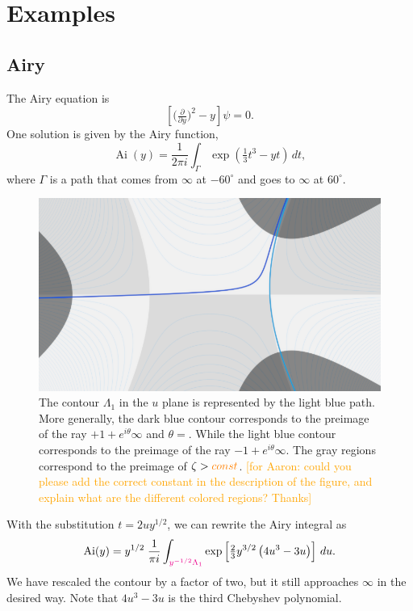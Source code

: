 \documentclass{article}
\let\Re\relax
\DeclareMathOperator{\Re}{Re}
\DeclareMathOperator{\Ai}{Ai}
\theoremstyle{definition}
\theoremstyle{plain}
\begin{document}
\section{Examples}\label{sec:examples}

\subsection{Airy}

The Airy equation is
\begin{equation}\label{eqn:airy}
\left[\big(\tfrac{\partial}{\partial y}\big)^2 - y\right] \psi = 0.
\end{equation}
One solution is given by the Airy function,
\[ \Ai(y) = \frac{1}{2\pi i} \int_{\Gamma} \exp\left(\tfrac{1}{3}t^3 - yt\right)\,dt, \]
where $\Gamma$ is a path that comes from $\infty$ at $-60^\circ$ and goes to $\infty$ at $60^\circ$.

\begin{figure}[ht]
    \centering
    \includegraphics[scale=0.3]{figures/thimble_Airy.png}
    \caption{\small The contour $\Lambda_1$ in the $u$ plane is represented by the light blue path. More generally, the dark blue contour corresponds to the preimage of the ray $+1+e^{i\theta}\infty$ and $\theta=$. While the light blue contour corresponds to the preimage of the ray $-1+e^{i\theta}\infty$. The gray regions correspond to the preimage of $\Re \zeta> \textcolor{orange}{const}$. \textcolor{orange}{[for Aaron: could you please add the correct constant in the description of the figure, and explain what are the different colored regions? Thanks]}}
    \label{fig:path_Airy}
\end{figure}


With the substitution $t = 2uy^{1/2}$, we can rewrite the Airy integral as
\[ \Ai(y) = y^{1/2}\;\frac{1}{\pi i} \int_{\textcolor{magenta}{y^{-1/2} \Lambda_1}} \exp\left[\tfrac{2}{3}y^{3/2} \left(4u^3 - 3u\right)\right]\,du. \]
We have rescaled the contour by a factor of two, but it still approaches $\infty$ in the desired way. Note that $4u^3 - 3u$ is the third Chebyshev polynomial.
\end{document}
